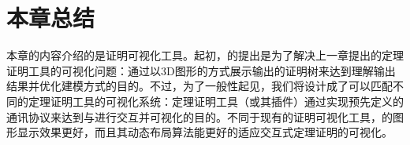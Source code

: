 \section{本章总结}
本章的内容介绍的是证明可视化工具。起初，的提出是为了解决上一章提出的定理证明工具\sctlprov{}的可视化问题：通过以3D图形的方式展示\sctlprov{}输出的证明树来达到理解输出结果并优化建模方式的目的。不过，为了一般性起见，我们将设计成了可以匹配不同的定理证明工具的可视化系统：定理证明工具（或其插件）通过实现预先定义的通讯协议来达到与进行交互并可视化的目的。不同于现有的证明可视化工具，的图形显示效果更好，而且其动态布局算法能更好的适应交互式定理证明的可视化。
